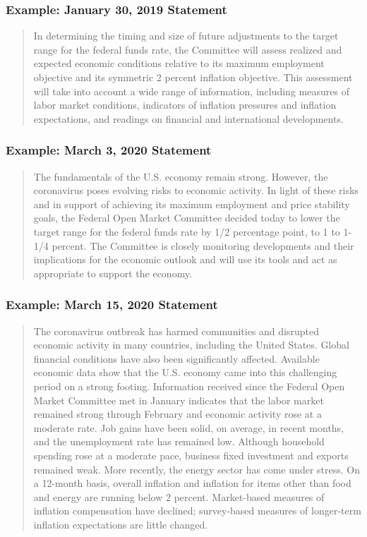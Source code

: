 \documentclass[english,xcolor=svgnames]{beamer}
\begin{document}
\begin{frame}
\frametitle{Example: January 30, 2019 Statement}
\begin{quotation}
In determining the timing and size of future adjustments to the target range for the federal funds rate, the Committee will assess realized and expected economic conditions relative to its maximum employment objective and its symmetric 2 percent inflation objective. This assessment will take into account a wide range of information, including measures of labor market conditions, indicators of inflation pressures and inflation expectations, and readings on financial and international developments.
\end{quotation}
\end{frame}


\begin{frame}
\frametitle{Example: March 3, 2020 Statement}
\begin{quotation}
The fundamentals of the U.S. economy remain strong. However, the coronavirus poses evolving risks to economic activity. In light of these risks and in support of achieving its maximum employment and price stability goals, the Federal Open Market Committee decided today to lower the target range for the federal funds rate by 1/2 percentage point, to 1 to
1-1/4 percent. The Committee is closely monitoring developments and their implications for the economic outlook and will use its tools and act as appropriate to support the economy.
\end{quotation}
\end{frame}


\begin{frame}
\frametitle{Example: March 15, 2020 Statement}
\begin{quotation}
The coronavirus outbreak has harmed communities and disrupted economic activity in many countries, including the United States. Global financial conditions have also been significantly affected. Available economic data show that the U.S. economy came into this challenging period on a strong footing. Information received since the Federal Open Market Committee met in January indicates that the labor market remained strong through February and economic activity rose at a moderate rate. Job gains have been solid, on average, in recent months, and the unemployment rate has remained low. Although household spending rose at a moderate pace, business fixed investment and exports remained weak. More recently, the energy sector has come under stress. On a 12-month basis, overall inflation and inflation for items other than food and energy are running below 2 percent. Market-based measures of inflation compensation have declined; survey-based measures of longer-term inflation expectations are little changed.

\end{quotation}
\end{frame}
\end{document}
